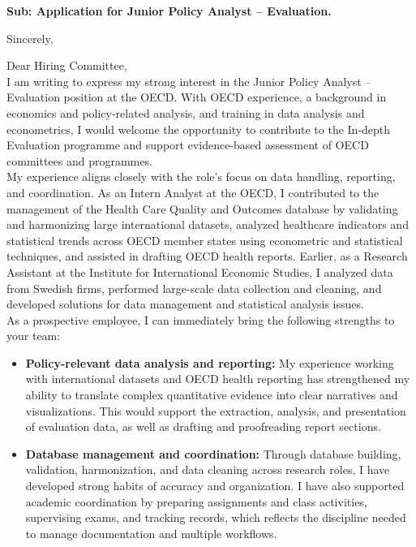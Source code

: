 \documentclass[11pt,a4paper,roman]{moderncv}
\begin{document}
\date{\today}
\opening{\textbf{Sub: Application for Junior Policy Analyst -- Evaluation.}}
\closing{Sincerely, \vspace{-1em}}


\makelettertitle



Dear Hiring Committee,
\\
\vspace{1em}
I am writing to express my strong interest in the Junior Policy Analyst -- Evaluation position at the OECD. With OECD experience, a background in economics and policy-related analysis, and training in data analysis and econometrics, I would welcome the opportunity to contribute to the In-depth Evaluation programme and support evidence-based assessment of OECD committees and programmes.\\

\vspace{1em}
My experience aligns closely with the role's focus on data handling, reporting, and coordination. As an Intern Analyst at the OECD, I contributed to the management of the Health Care Quality and Outcomes database by validating and harmonizing large international datasets, analyzed healthcare indicators and statistical trends across OECD member states using econometric and statistical techniques, and assisted in drafting OECD health reports. Earlier, as a Research Assistant at the Institute for International Economic Studies, I analyzed data from Swedish firms, performed large-scale data collection and cleaning, and developed solutions for data management and statistical analysis issues.\\

\vspace{1em}
As a prospective employee, I can immediately bring the following strengths to your team:
\vspace{0.5em}
\begin{itemize}
\item \textbf{Policy-relevant data analysis and reporting:} My experience working with international datasets and OECD health reporting has strengthened my ability to translate complex quantitative evidence into clear narratives and visualizations. This would support the extraction, analysis, and presentation of evaluation data, as well as drafting and proofreading report sections.
\item \textbf{Database management and coordination:} Through database building, validation, harmonization, and data cleaning across research roles, I have developed strong habits of accuracy and organization. I have also supported academic coordination by preparing assignments and class activities, supervising exams, and tracking records, which reflects the discipline needed to manage documentation and multiple workflows.
\end{itemize}
\end{document}
